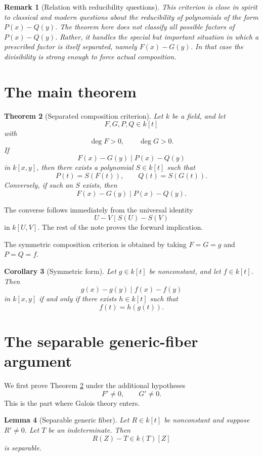 \documentclass[12pt]{article}
\newtheorem{theorem}{Theorem}
\newtheorem{lemma}[theorem]{Lemma}
\newtheorem{corollary}[theorem]{Corollary}
\newtheorem{remark}[theorem]{Remark}
\begin{document}
\begin{remark}[Relation with reducibility questions]
This criterion is close in spirit to classical and modern questions about the reducibility of polynomials of the form \(P(x)-Q(y)\).  The theorem here does not classify all possible factors of \(P(x)-Q(y)\).  Rather, it handles the special but important situation in which a prescribed factor is itself separated, namely \(F(x)-G(y)\).  In that case the divisibility is strong enough to force actual composition.
\end{remark}

\section{The main theorem}

\begin{theorem}[Separated composition criterion]\label{thm:main}
Let \(k\) be a field, and let
\[
    F,G,P,Q\in k[t]
\]
with
\[
    \deg F>0,\qquad \deg G>0.
\]
If
\[
    F(x)-G(y)\mid P(x)-Q(y)
\]
in \(k[x,y]\), then there exists a polynomial \(S\in k[t]\) such that
\[
    P(t)=S(F(t)),
    \qquad
    Q(t)=S(G(t)).
\]
Conversely, if such an \(S\) exists, then
\[
    F(x)-G(y)
    \mid
    P(x)-Q(y).
\]
\end{theorem}

The converse follows immediately from the universal identity
\[
    U-V \mid S(U)-S(V)
\]
in \(k[U,V]\).  The rest of the note proves the forward implication.

The symmetric composition criterion is obtained by taking \(F=G=g\) and \(P=Q=f\).

\begin{corollary}[Symmetric form]\label{cor:symmetric}
Let \(g\in k[t]\) be nonconstant, and let \(f\in k[t]\). Then
\[
    g(x)-g(y)\mid f(x)-f(y)
\]
in \(k[x,y]\) if and only if there exists \(h\in k[t]\) such that
\[
    f(t)=h(g(t)).
\]
\end{corollary}

\section{The separable generic-fiber argument}

We first prove Theorem \ref{thm:main} under the additional hypotheses
\[
    F'\neq 0,
    \qquad
    G'\neq 0.
\]
This is the part where Galois theory enters.

\begin{lemma}[Separable generic fiber]\label{lem:separable-generic-fiber}
Let \(R\in k[t]\) be nonconstant and suppose \(R'\neq 0\).  Let \(T\) be an indeterminate. Then
\[
    R(Z)-T\in k(T)[Z]
\]
is separable.
\end{lemma}
\end{document}
